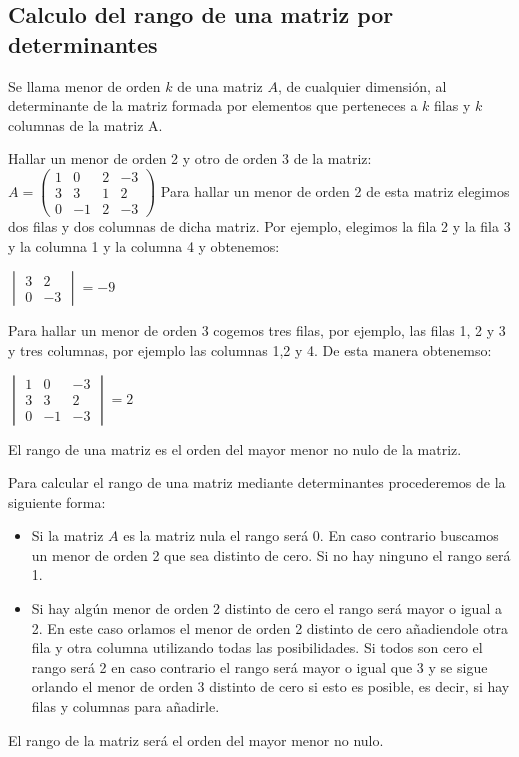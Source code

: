 \subsection{Calculo del rango de una matriz por determinantes}

\begin{definicion}
Se llama menor de orden $k$ de una matriz $A$, de cualquier dimensión, al determinante de la matriz formada por elementos que perteneces a $k$ filas y $k$ columnas de la matriz A.
\end{definicion}

\begin{ejemplo}
Hallar un menor de orden 2 y otro de orden 3 de la matriz: $A=\begin{pmatrix}
1 & 0 & 2 & -3 \\
3 & 3 & 1 & 2 \\
0 & -1 & 2 & -3
\end{pmatrix}$
\tcblower
Para hallar un menor de orden 2 de esta matriz elegimos dos filas y dos columnas de dicha matriz. Por ejemplo, elegimos la fila 2 y la fila 3 y la columna 1 y la columna 4 y obtenemos:

$\begin{vmatrix}
3 & 2 \\
0 & -3
\end{vmatrix}= -9$

Para hallar un menor de orden 3 cogemos tres filas, por ejemplo, las filas 1, 2 y 3 y tres columnas, por ejemplo las columnas 1,2 y 4. De esta manera obtenemso:

$\begin{vmatrix}
1 & 0 & -3 \\
3 & 3 & 2 \\
0 & -1 & -3
\end{vmatrix}= 2$
\end{ejemplo}

\begin{definicion}
El rango de una matriz es el orden del mayor menor no nulo de la matriz.
\end{definicion}

Para calcular el rango de una matriz mediante determinantes procederemos de la siguiente forma:

\begin{itemize}
\item Si la matriz $A$ es la matriz nula el rango será 0. En caso contrario buscamos un menor de orden 2 que sea distinto de cero. Si no hay ninguno el rango será 1.
\item Si hay algún menor de orden 2 distinto de cero el rango será mayor o igual a 2. En este caso orlamos el menor de orden 2 distinto de cero añadiendole otra fila y otra columna utilizando todas las posibilidades. Si todos son cero el rango será 2 en caso contrario el rango será mayor o igual que 3 y se sigue orlando el menor de orden 3 distinto de cero si esto es posible, es decir, si hay filas y columnas para añadirle.
\end{itemize}
El rango de la matriz será el orden del mayor menor no nulo.

